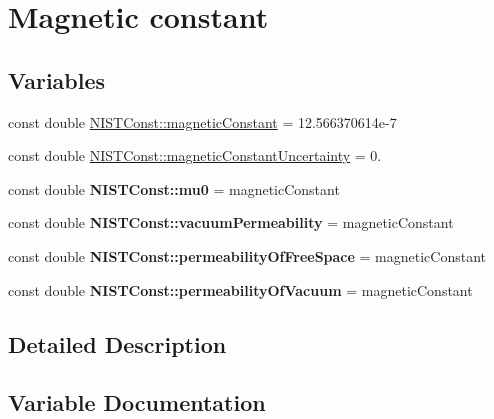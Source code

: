 \hypertarget{group___magnetic_constant}{}\section{Magnetic constant}
\label{group___magnetic_constant}
\subsection*{Variables}
\begin{DoxyCompactItemize}
\item 
const double \hyperlink{group___magnetic_constant_ga511860d1f2830ae6a85e1b1df8522071}{N\+I\+S\+T\+Const\+::magnetic\+Constant} = 12.\+566370614e-\/7
\item 
const double \hyperlink{group___magnetic_constant_ga17f91f2aa414afe44a0bc84825034a4e}{N\+I\+S\+T\+Const\+::magnetic\+Constant\+Uncertainty} = 0.
\item 
\mbox{\label{group___magnetic_constant_gaee4806f14e9b0f48347b2d29ddcd2668}} 
const double {\bfseries N\+I\+S\+T\+Const\+::mu0} = magnetic\+Constant
\item 
\mbox{\label{group___magnetic_constant_ga2bf51bbe9c6b75752250c9b133758223}} 
const double {\bfseries N\+I\+S\+T\+Const\+::vacuum\+Permeability} = magnetic\+Constant
\item 
\mbox{\label{group___magnetic_constant_gad7321a170873a7532ecfb8383d827d1e}} 
const double {\bfseries N\+I\+S\+T\+Const\+::permeability\+Of\+Free\+Space} = magnetic\+Constant
\item 
\mbox{\label{group___magnetic_constant_ga7210c41dfc8fb9dbc41c83282eafebc6}} 
const double {\bfseries N\+I\+S\+T\+Const\+::permeability\+Of\+Vacuum} = magnetic\+Constant
\end{DoxyCompactItemize}


\subsection{Detailed Description}


\subsection{Variable Documentation}
\mbox{\label{group___magnetic_constant_ga511860d1f2830ae6a85e1b1df8522071}} 
